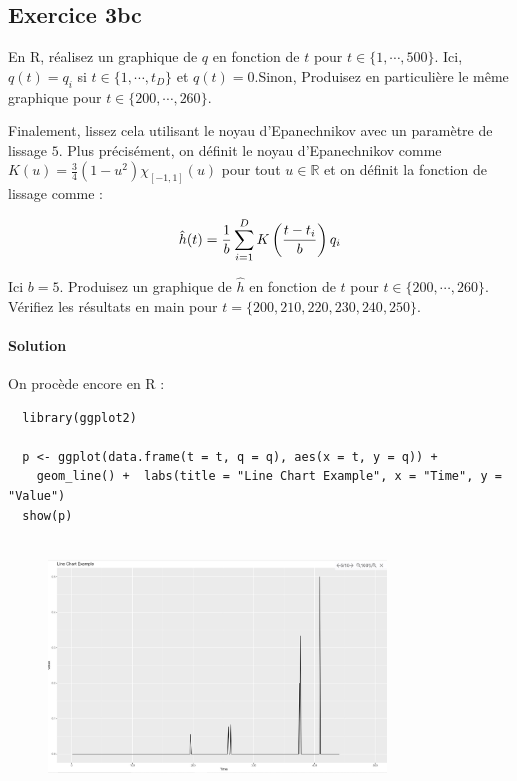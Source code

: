 \documentclass[../main.tex]{subfiles}
\begin{document}
\begin{CJK*}{UTF8}{gbsn}
\section*{Exercice 3bc}
En R, réalisez un graphique de $q$ en fonction de $t$ pour $t \in \{1, \cdots, 500\}$.
Ici, $q(t) = q_i$ si $t \in \{1, \cdots, t_D\}$ et $q(t) = 0$.Sinon,
Produisez en particulière le même graphique pour $t \in \{200, \cdots, 260\}$.

Finalement, lissez cela utilisant le noyau d'Epanechnikov avec un paramètre de lissage $5$.
Plus précisément, on définit le noyau d'Epanechnikov comme $K(u) = \frac{3}{4}(1-u^2)\chi_{[-1,1]}(u)$
pour tout $u \in \mathbb{R}$ et on définit la fonction de lissage comme :

\begin{equation*}
    \hat{h}(t) = \frac{1}{b} \sum_{i=1}^D K\left ( \frac{t-t_i}{b} \right ) q_i
\end{equation*}

Ici $b = 5$. 
Produisez un graphique de $\hat{h}$ en fonction de $t$ pour $t \in \{200, \cdots, 260\}$.
Vérifiez les résultats en main pour $t = \{200, 210, 220, 230, 240, 250\}$.

\smallskip
\paragraph{Solution}

On procède encore en R :

\begin{lstlisting}
  library(ggplot2)
  
  p <- ggplot(data.frame(t = t, q = q), aes(x = t, y = q)) +
    geom_line() +  labs(title = "Line Chart Example", x = "Time", y = "Value")
  show(p)
  
\end{lstlisting}
  
\begin{figure}[H]
  \centering
  \includegraphics[width=0.8\textwidth]{3BC.JPG}
  \label{fig:mesh1}
\end{figure}


\end{CJK*}
\end{document}
